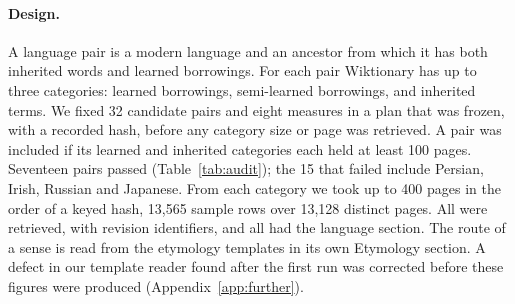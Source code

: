 \documentclass[11pt]{article}
\begin{document}
\paragraph{Design.} A language pair is a modern language and an ancestor from which it has both inherited words and learned borrowings. For each pair Wiktionary has up to three categories: learned borrowings, semi-learned borrowings, and inherited terms. We fixed 32 candidate pairs and eight measures in a plan that was frozen, with a recorded hash, before any category size or page was retrieved. A pair was included if its learned and inherited categories each held at least 100 pages. Seventeen pairs passed (Table~\ref{tab:audit}); the 15 that failed include Persian, Irish, Russian and Japanese. From each category we took up to 400 pages in the order of a keyed hash, 13,565 sample rows over 13,128 distinct pages. All were retrieved, with revision identifiers, and all had the language section. The route of a sense is read from the etymology templates in its own Etymology section. A defect in our template reader found after the first run was corrected before these figures were produced (Appendix~\ref{app:further}).
\end{document}
